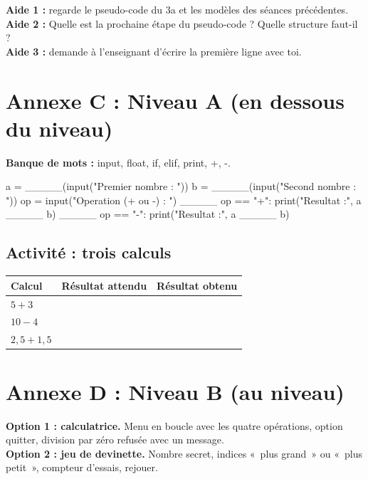 \documentclass[11pt,a4paper]{article}
\begin{document}
\begin{tcolorbox}[colback=yellow!10,colframe=yellow!50!black,title={Cartes d'aide à utiliser dans l'ordre},fonttitle=\bfseries\small]
\textbf{Aide 1 :} regarde le pseudo-code du 3a et les modèles des séances précédentes.\\
\textbf{Aide 2 :} Quelle est la prochaine étape du pseudo-code ? Quelle structure faut-il ?\\
\textbf{Aide 3 :} demande à l'enseignant d'écrire la première ligne avec toi.
\end{tcolorbox}

\newpage
\section*{Annexe C : Niveau A (en dessous du niveau)}

\textbf{Banque de mots :} input, float, if, elif, print, +, -.

\begin{python}[niveauA.py]
a = _____(input("Premier nombre : "))
b = _____(input("Second nombre : "))
op = input("Operation (+ ou -) : ")
_____ op == "+":
    print("Resultat :", a _____ b)
_____ op == "-":
    print("Resultat :", a _____ b)
\end{python}

\subsection*{Activité : trois calculs}
\begin{tabularx}{\linewidth}{>{\bfseries}p{4cm}Y Y}
\toprule
Calcul & Résultat attendu & Résultat obtenu\\
\midrule
$5 + 3$ & & \\ $10 - 4$ & & \\ $2{,}5 + 1{,}5$ & & \\
\bottomrule
\end{tabularx}

\newpage
\section*{Annexe D : Niveau B (au niveau)}

\textbf{Option 1 : calculatrice.} Menu en boucle avec les quatre opérations, option quitter, division par zéro refusée avec un message.\\
\textbf{Option 2 : jeu de devinette.} Nombre secret, indices «~plus grand~» ou «~plus petit~», compteur d'essais, rejouer.
\end{document}
